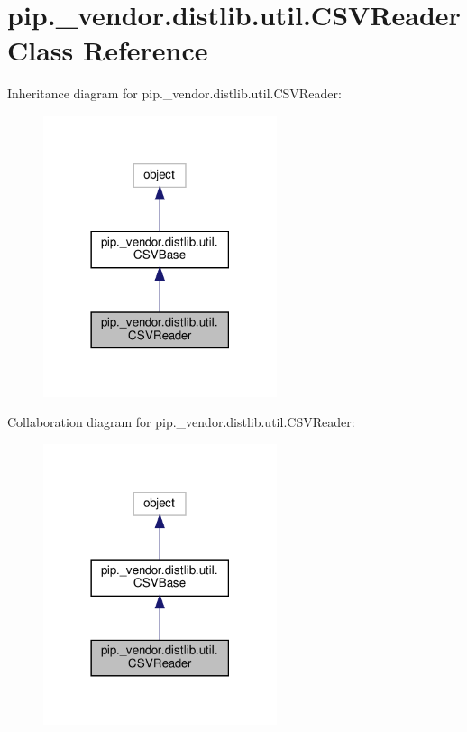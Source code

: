 \hypertarget{classpip_1_1__vendor_1_1distlib_1_1util_1_1CSVReader}{}\section{pip.\+\_\+vendor.\+distlib.\+util.\+C\+S\+V\+Reader Class Reference}
\label{classpip_1_1__vendor_1_1distlib_1_1util_1_1CSVReader}


Inheritance diagram for pip.\+\_\+vendor.\+distlib.\+util.\+C\+S\+V\+Reader\+:
\nopagebreak
\begin{figure}[H]
\begin{center}
\leavevmode
\includegraphics[width=194pt]{classpip_1_1__vendor_1_1distlib_1_1util_1_1CSVReader__inherit__graph}
\end{center}
\end{figure}


Collaboration diagram for pip.\+\_\+vendor.\+distlib.\+util.\+C\+S\+V\+Reader\+:
\nopagebreak
\begin{figure}[H]
\begin{center}
\leavevmode
\includegraphics[width=194pt]{classpip_1_1__vendor_1_1distlib_1_1util_1_1CSVReader__coll__graph}
\end{center}
\end{figure}
